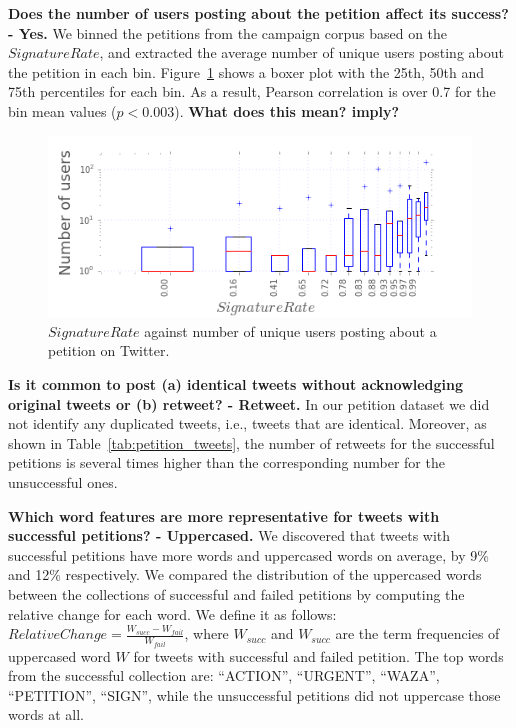 \textbf{Does the number of users posting about the petition affect its success? - Yes.} We binned the petitions from the campaign corpus based on the $SignatureRate$, and extracted the average number of unique users posting about the petition in each bin. Figure~\ref{fig:signatures_vs_users} shows a boxer plot with the 25th, 50th and 75th percentiles for each bin. As a result, Pearson correlation is over 0.7 for the bin mean values (\(p < 0.003\)). {\bf What does this mean? imply?}

\begin{figure}
\centering
\includegraphics[width=\columnwidth]{figures/signaturesgoalVSnumusersCampaigns.png}
\caption{$SignatureRate$ against number of unique users posting about a petition on Twitter.}
\label{fig:signatures_vs_users}
\end{figure}

\textbf{Is it common to post (a) identical tweets without acknowledging original tweets or (b) retweet? - Retweet.} In our petition dataset we did not identify any duplicated tweets, i.e., tweets that are identical. Moreover, as shown in Table~\ref{tab:petition_tweets}, the number of retweets for the successful petitions is several times higher than the corresponding number for the unsuccessful ones.

\textbf{Which word features are more representative for tweets with successful petitions? - Uppercased.} We discovered that tweets with successful petitions have more words and uppercased words on average, by 9\% and 12\% respectively. We compared the distribution of the uppercased words between the collections of successful and failed petitions by computing the relative change for each word. We define it as follows: $RelativeChange = \frac{W_{succ} - W_{fail}}{W_{fail}}$, where $W_{succ}$ and $W_{succ}$ are the term frequencies of uppercased word $W$ for tweets with successful and failed petition. The top words from the successful collection are: ``ACTION'', ``URGENT'', ``WAZA'', ``PETITION'', ``SIGN'', while the unsuccessful petitions did not uppercase those words at all.
